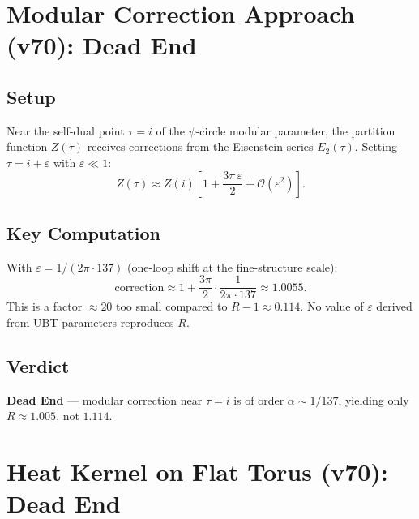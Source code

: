 \documentclass[11pt,a4paper]{article}
\theoremstyle{remark}
\begin{document}
\section{Modular Correction Approach (v70): Dead End}
\label{sec:modular}

\subsection{Setup}

Near the self-dual point $\tau = i$ of the $\psi$-circle modular parameter,
the partition function $Z(\tau)$ receives corrections from the Eisenstein series
$E_2(\tau)$.  Setting $\tau = i + \varepsilon$ with $\varepsilon \ll 1$:
\begin{equation}
  Z(\tau) \approx Z(i)\!\left[1 + \frac{3\pi\,\varepsilon}{2} + \mathcal{O}(\varepsilon^2)\right].
\end{equation}

\subsection{Key Computation}

With $\varepsilon = 1/(2\pi \cdot 137)$ (one-loop shift at the fine-structure
scale):
\begin{equation}
  \text{correction} \approx 1 + \frac{3\pi}{2}\cdot\frac{1}{2\pi\cdot 137}
  \approx 1.0055.
\end{equation}
This is a factor $\approx 20$ too small compared to $R - 1 \approx 0.114$.
No value of $\varepsilon$ derived from UBT parameters reproduces $R$.

\subsection{Verdict}

\begin{center}
\textbf{Dead End} — modular correction near $\tau = i$ is of order $\alpha \sim 1/137$,
yielding only $R \approx 1.005$, not $1.114$.
\end{center}

\section{Heat Kernel on Flat Torus (v70): Dead End}
\label{sec:heat_kernel}
\end{document}

